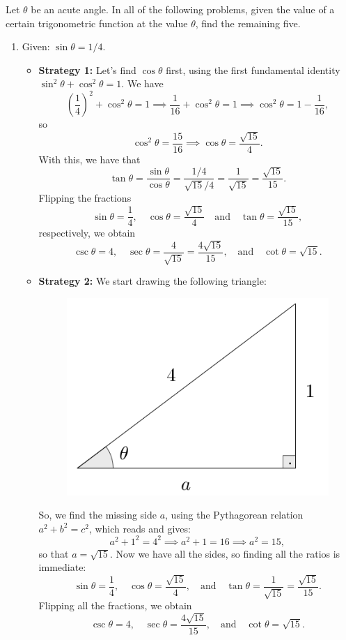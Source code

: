 \documentclass{ximera}
\begin{document}
\begin{example}
  Let $\theta$ be an acute angle. In all of the following problems, given the value of a certain trigonometric function at the value $\theta$, find the remaining five.
  \begin{enumerate}[label=\alph*.]
  \item Given: $\sin\theta = 1/4$.

    \begin{explanation}
      \begin{itemize}
      \item {\bf Strategy 1:}      Let's find $\cos\theta$ first, using the first fundamental identity $\sin^2\theta+\cos^2\theta=1$. We have $$\left(\frac{1}{4}\right)^2 + \cos^2\theta=1 \implies \frac{1}{16}+\cos^2\theta=1 \implies \cos^2\theta = 1-\frac{1}{16},$$so $$\cos^2\theta = \frac{15}{16} \implies \cos\theta = \frac{\sqrt{15}}{4}.$$ With this, we have that \[   \tan\theta = \frac{\sin\theta}{\cos\theta} = \frac{1/4}{\sqrt{15}/4} = \frac{1}{\sqrt{15}} = \frac{\sqrt{15}}{15}.  \]Flipping the fractions $$\sin\theta = \frac{1}{4}, \quad \cos\theta = \frac{\sqrt{15}}{4} \quad\mbox{and}\quad \tan\theta = \frac{\sqrt{15}}{15},$$respectively, we obtain $$\csc\theta = 4, \quad \sec\theta = \frac{4}{\sqrt{15}} = \frac{4\sqrt{15}}{15},\quad\mbox{and}\quad \cot\theta = \sqrt{15}.$$

      \item {\bf Strategy 2:}  We start drawing the following triangle:
        \begin{figure}[h]
          \centering
          \includegraphics[scale=.3]{./figures/9-1-3-triangle-sin-1-4.png}
        \end{figure}
        So, we find the missing side $a$, using the Pythagorean relation $a^2+b^2=c^2$, which reads and gives: $$a^2+1^2 = 4^2 \implies a^2+1=16\implies a^2=15,$$so that $a=\sqrt{15}$. Now we have all the sides, so finding all the ratios is immediate: $$\sin\theta = \frac{1}{4},\quad \cos\theta=\frac{\sqrt{15}}{4},\quad\mbox{and}\quad\tan\theta=\frac{1}{\sqrt{15}}=\frac{\sqrt{15}}{15}.$$Flipping all the fractions, we obtain$$\csc\theta = 4,\quad \sec\theta=\frac{4\sqrt{15}}{15},\quad\mbox{and}\quad\cot\theta=\sqrt{15}.$$
      \end{itemize}
    \end{explanation}
    

\end{enumerate}
\end{example}
\end{document}
